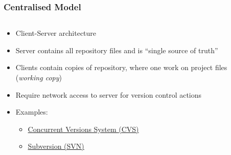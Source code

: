 \documentclass{git_course}
\begin{document}
\begin{frame}[fragile]
\frametitle{Centralised Model}
\begin{columns}[T]
    \begin{column}{0.7\textwidth}
        \begin{itemize}
            \item Client-Server architecture
            \item Server contains all repository files and is ``single source of truth''
            \item Clients contain copies of repository, where one work on project
                files (\emph{working copy})
            \item Require network access to server for version control actions
            \item Examples:
            \begin{itemize}
                \item \href{https://en.wikipedia.org/wiki/Concurrent_Versions_System}
                           {Concurrent Versions System (CVS)}
                \item \href{https://en.wikipedia.org/wiki/Apache_Subversion}
                           {Subversion (SVN)}
            \end{itemize}
        \end{itemize}
    \end{column}
    \begin{column}{0.4\textwidth}
        \begin{center}
        \resizebox{\textwidth}{!}{}
        \end{center}
    \end{column}
\end{columns}
\end{frame}
\end{document}
